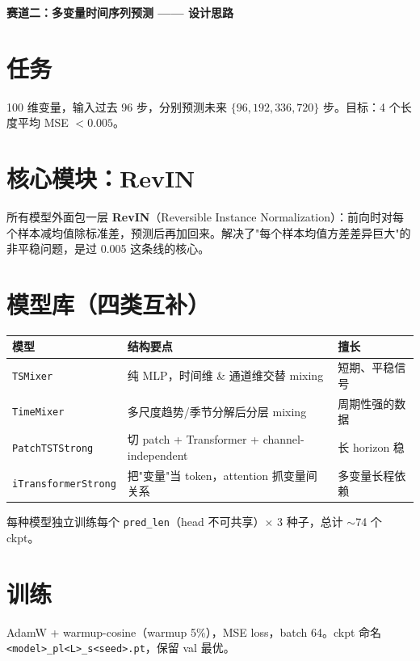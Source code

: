 \documentclass[10pt,a4paper]{ctexart}
\begin{document}
\begin{center}\large\bfseries 赛道二：多变量时间序列预测 —— 设计思路\end{center}
\vspace{-0.6em}

\section{任务}
100 维变量，输入过去 96 步，分别预测未来 $\{96,192,336,720\}$ 步。目标：4 个长度平均 MSE $<0.005$。

\section{核心模块：RevIN}
所有模型外面包一层 \textbf{RevIN}（Reversible Instance Normalization）：前向时对每个样本减均值除标准差，预测后再加回来。解决了"每个样本均值方差差异巨大"的非平稳问题，是过 0.005 这条线的核心。

\section{模型库（四类互补）}
\vspace{-0.3em}
\begin{center}\small
\begin{tabular}{lll}
\toprule
模型 & 结构要点 & 擅长 \\
\midrule
\texttt{TSMixer}            & 纯 MLP，时间维 \& 通道维交替 mixing            & 短期、平稳信号 \\
\texttt{TimeMixer}          & 多尺度趋势/季节分解后分层 mixing               & 周期性强的数据 \\
\texttt{PatchTSTStrong}     & 切 patch + Transformer + channel-independent  & 长 horizon 稳 \\
\texttt{iTransformerStrong} & 把"变量"当 token，attention 抓变量间关系       & 多变量长程依赖 \\
\bottomrule
\end{tabular}
\end{center}
\vspace{-0.3em}
每种模型独立训练每个 \texttt{pred\_len}（head 不可共享）$\times$ 3 种子，总计 $\sim$74 个 ckpt。

\section{训练}
AdamW + warmup-cosine（warmup 5\%），MSE loss，batch 64。ckpt 命名 \texttt{<model>\_pl<L>\_s<seed>.pt}，保留 val 最优。
\end{document}
